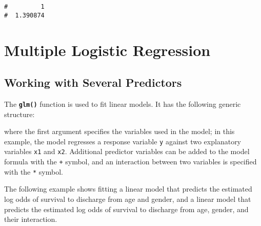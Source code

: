 \documentclass[letterpaper,12pt,twoside,]{pinp}
\begin{document}
\begin{Shaded}
\begin{Highlighting}[]
 \NormalTok{(} \NormalTok{))}
\end{Highlighting}
\end{Shaded}

\begin{ShadedResult}
\begin{verbatim}
#         1 
#  1.390874
\end{verbatim}
\end{ShadedResult}

\newpage

\hypertarget{multiple-logistic-regression}{%
\section{Multiple Logistic
Regression}\label{multiple-logistic-regression}}

\hypertarget{working-with-several-predictors}{%
\subsection{Working with Several
Predictors}\label{working-with-several-predictors}}

The \textbf{\texttt{glm()}} function is used to fit linear models. It
has the following generic structure:

\begin{Shaded}
\begin{Highlighting}[]
\OperatorTok{~}\StringTok{ }\OperatorTok{+}\StringTok{ } \NormalTok{(} \NormalTok{))}
\end{Highlighting}
\end{Shaded}

where the first argument specifies the variables used in the model; in
this example, the model regresses a response variable \texttt{y} against
two explanatory variables \texttt{x1} and \texttt{x2}. Additional
predictor variables can be added to the model formula with the
\texttt{+} symbol, and an interaction between two variables is specified
with the \texttt{*} symbol.

The following example shows fitting a linear model that predicts the
estimated log odds of survival to discharge from age and gender, and a
linear model that predicts the estimated log odds of survival to
discharge from age, gender, and their interaction.
\end{document}
